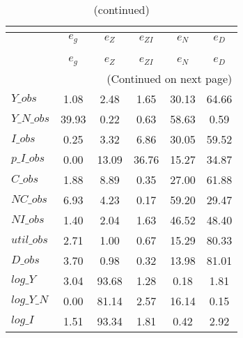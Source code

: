  
\begin{center}
\begin{longtable}{lccccc} 
\caption{VARIANCE DECOMPOSITION (in percent)}\\
 \label{Table:th_var_decomp_uncond}\\
\toprule 
$           $	 & 	 $       {e_g}$	 & 	 $       {e_Z}$	 & 	 $    {e_{ZI}}$	 & 	 $       {e_N}$	 & 	 $       {e_D}$\\
\midrule \endfirsthead 
\caption{(continued)}\\
 \toprule \\ 
$           $	 & 	 $       {e_g}$	 & 	 $       {e_Z}$	 & 	 $    {e_{ZI}}$	 & 	 $       {e_N}$	 & 	 $       {e_D}$\\
\midrule \endhead 
\midrule \multicolumn{6}{r}{(Continued on next page)} \\ \bottomrule \endfoot 
\bottomrule \endlastfoot 
$Y\_obs     $	 & 	        1.08	 & 	        2.48	 & 	        1.65	 & 	       30.13	 & 	       64.66 \\ 
$Y\_N\_obs  $	 & 	       39.93	 & 	        0.22	 & 	        0.63	 & 	       58.63	 & 	        0.59 \\ 
$I\_obs     $	 & 	        0.25	 & 	        3.32	 & 	        6.86	 & 	       30.05	 & 	       59.52 \\ 
$p\_I\_obs  $	 & 	        0.00	 & 	       13.09	 & 	       36.76	 & 	       15.27	 & 	       34.87 \\ 
$C\_obs     $	 & 	        1.88	 & 	        8.89	 & 	        0.35	 & 	       27.00	 & 	       61.88 \\ 
$NC\_obs    $	 & 	        6.93	 & 	        4.23	 & 	        0.17	 & 	       59.20	 & 	       29.47 \\ 
$NI\_obs    $	 & 	        1.40	 & 	        2.04	 & 	        1.63	 & 	       46.52	 & 	       48.40 \\ 
$util\_obs  $	 & 	        2.71	 & 	        1.00	 & 	        0.67	 & 	       15.29	 & 	       80.33 \\ 
$D\_obs     $	 & 	        3.70	 & 	        0.98	 & 	        0.32	 & 	       13.98	 & 	       81.01 \\ 
$log\_Y     $	 & 	        3.04	 & 	       93.68	 & 	        1.28	 & 	        0.18	 & 	        1.81 \\ 
$log\_Y\_N  $	 & 	        0.00	 & 	       81.14	 & 	        2.57	 & 	       16.14	 & 	        0.15 \\ 
$log\_I     $	 & 	        1.51	 & 	       93.34	 & 	        1.81	 & 	        0.42	 & 	        2.92 \\ 

\end{longtable}
\end{center}
